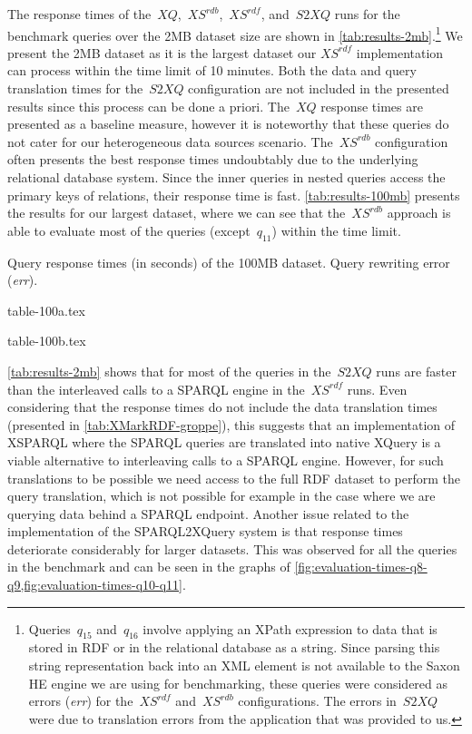 The response times of the~$\mathit{XQ}$,~$\mathit{XS^{rdb}}$,~$\mathit{XS^{rdf}}$, and~$\mathit{S2XQ}$ runs for the
benchmark queries over the 2MB dataset size are shown in \cref{tab:results-2mb}.\footnote{Queries~$q_{15}$ and~$q_{16}$
  involve applying an XPath expression to data that is stored in \ac{RDF} or in the relational database as a string.
  Since parsing this string representation back into an \ac{XML} element is not available to the Saxon HE engine we are
  using for benchmarking, these queries were considered as errors (\textit{err}) for the~$\mathit{XS^{rdf}}$
  and~$\mathit{XS^{rdb}}$ configurations.
    The errors in~$\mathit{S2XQ}$ were due to translation errors from the application that was provided to us.} We present
the 2MB dataset as it is the largest dataset our $\mathit{XS^{rdf}}$ implementation can process within the time limit of
10 minutes.
%
Both the data and query translation times for the~$\mathit{S2XQ}$ configuration are not included in the presented
results since this process can be done a priori.
%
The~$\mathit{XQ}$ response times are presented as a baseline measure, however it is noteworthy that these queries do not
cater for our heterogeneous data sources scenario.
%
The~$\mathit{XS^{rdb}}$ configuration often presents the best response times undoubtably due to the underlying
relational database system.  Since the inner queries in nested queries access the primary keys of relations, their
response time is fast.  \cref{tab:results-100mb} presents the results for our largest dataset, where we can see that
the~$\mathit{XS^{rdb}}$ approach is able to evaluate most of the queries (except~$q_{11}$) within the time limit.
%
\begin{table*}[t]
  \caption[Query response times (in seconds) of the 100MB dataset.]{Query response times (in seconds) of the 100MB dataset.  Query rewriting error (\textit{err}).}
  \label{tab:results-100mb}
  \centering
  {table-100a.tex}

  \vspace{5pt}  

  {table-100b.tex}
\end{table*}


\cref{tab:results-2mb} shows that for most of the queries in the~$\mathit{S2XQ}$ runs are faster than the
interleaved calls to a SPARQL engine in the~$\mathit{XS^{rdf}}$ runs.
%
Even considering that the response times do not include the data translation times (presented in
\cref{tab:XMarkRDF-groppe}), this suggests that an implementation of XSPARQL where the SPARQL queries are translated
into native XQuery is a viable alternative to interleaving calls to a SPARQL engine.  However, for such translations to
be possible we need access to the full \ac{RDF} dataset to perform the query translation, which is not possible for
example in the case where we are querying data behind a SPARQL endpoint.
%
Another issue related to the implementation of the SPARQL2XQuery system is that response times deteriorate
considerably for larger datasets.  This was observed for all the queries in the benchmark and can be seen in the graphs
of \cref{fig:evaluation-times-q8-q9,fig:evaluation-times-q10-q11}.

